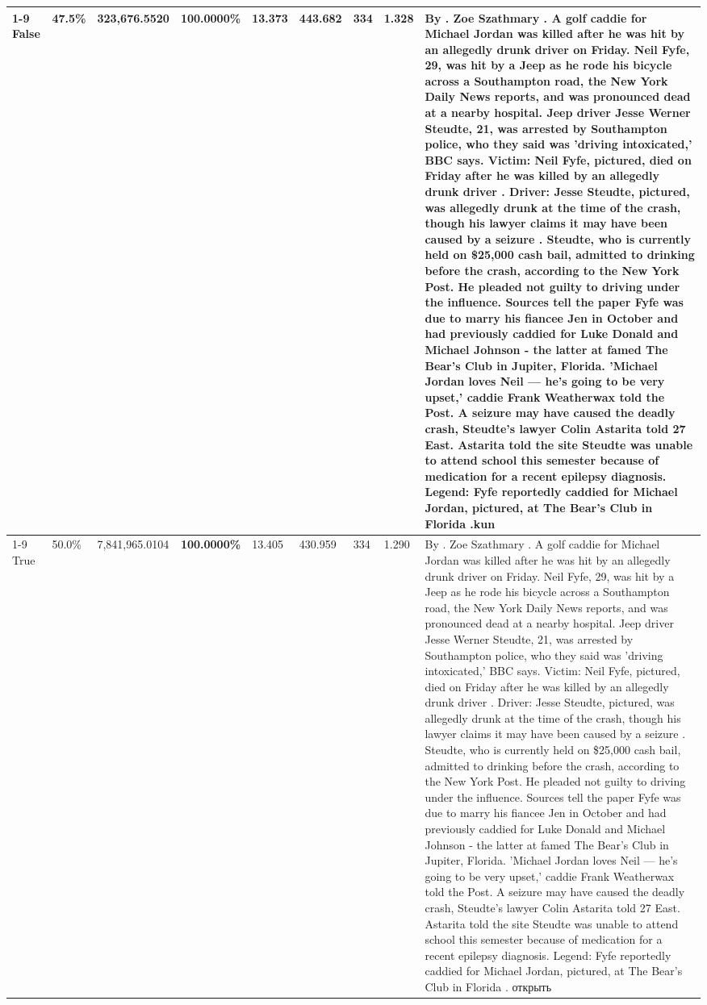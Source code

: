 \begin{table}[H]
\begin{tabular}{lllrlllll}
\cline{1-9}
False & 47.5\% & 323,676.5520 & \bfseries \color{red} 100.0000\% & 13.373 & 443.682 & 334 & 1.328 & By . Zoe Szathmary . A golf caddie for Michael Jordan was killed after he was hit by an allegedly drunk driver on Friday. Neil Fyfe, 29, was hit by a Jeep as he rode his bicycle across a Southampton road, the New York Daily News reports, and was pronounced dead at a nearby hospital. Jeep driver Jesse Werner Steudte, 21, was arrested by Southampton police, who they said was 'driving intoxicated,' BBC says. Victim: Neil Fyfe, pictured, died on Friday after he was killed by an allegedly drunk driver . Driver: Jesse Steudte, pictured, was allegedly drunk at the time of the crash, though his lawyer claims it may have been caused by a seizure . Steudte, who is currently held on \$25,000 cash bail, admitted to drinking before the crash, according to the New York Post. He pleaded not guilty to driving under the influence. Sources tell the paper Fyfe was due to marry his fiancee Jen in October and had previously caddied for Luke Donald and Michael Johnson - the latter at famed The Bear's Club in Jupiter, Florida. 'Michael Jordan loves Neil — he’s going to be very upset,' caddie Frank Weatherwax told the Post. A seizure may have caused the deadly crash, Steudte's lawyer Colin Astarita told 27 East. Astarita told the site Steudte was unable to attend school this semester because of medication for a recent epilepsy diagnosis. Legend: Fyfe reportedly caddied for Michael Jordan, pictured, at The Bear's Club in Florida .kun \\
\cline{1-9}
True & 50.0\% & 7,841,965.0104 & \bfseries \color{red} 100.0000\% & 13.405 & 430.959 & 334 & 1.290 & By . Zoe Szathmary . A golf caddie for Michael Jordan was killed after he was hit by an allegedly drunk driver on Friday. Neil Fyfe, 29, was hit by a Jeep as he rode his bicycle across a Southampton road, the New York Daily News reports, and was pronounced dead at a nearby hospital. Jeep driver Jesse Werner Steudte, 21, was arrested by Southampton police, who they said was 'driving intoxicated,' BBC says. Victim: Neil Fyfe, pictured, died on Friday after he was killed by an allegedly drunk driver . Driver: Jesse Steudte, pictured, was allegedly drunk at the time of the crash, though his lawyer claims it may have been caused by a seizure . Steudte, who is currently held on \$25,000 cash bail, admitted to drinking before the crash, according to the New York Post. He pleaded not guilty to driving under the influence. Sources tell the paper Fyfe was due to marry his fiancee Jen in October and had previously caddied for Luke Donald and Michael Johnson - the latter at famed The Bear's Club in Jupiter, Florida. 'Michael Jordan loves Neil — he’s going to be very upset,' caddie Frank Weatherwax told the Post. A seizure may have caused the deadly crash, Steudte's lawyer Colin Astarita told 27 East. Astarita told the site Steudte was unable to attend school this semester because of medication for a recent epilepsy diagnosis. Legend: Fyfe reportedly caddied for Michael Jordan, pictured, at The Bear's Club in Florida . открыть \\

\end{tabular}
\end{table}
